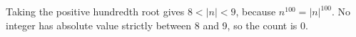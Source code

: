 Taking the positive hundredth root gives $8<|n|<9$, because $n^{100}=|n|^{100}$. No integer has absolute value strictly between 8 and 9, so the count is $\boxed0$.
